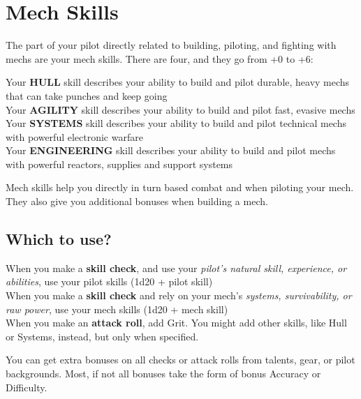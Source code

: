 \section{Mech Skills}

The part of your pilot directly related to building, piloting, and fighting with mechs are your mech
skills. There are four, and they go from +0 to +6:

Your \textbf{HULL} skill describes your ability to build and pilot durable, heavy mechs that can take
punches and keep going \\
Your \textbf{AGILITY} skill describes your ability to build and pilot fast,
evasive mechs \\
Your \textbf{SYSTEMS} skill describes your ability to build and pilot technical mechs with powerful
electronic warfare \\
Your \textbf{ENGINEERING} skill describes your ability to build and pilot mechs with powerful reactors,
supplies and support systems

Mech skills help you directly in turn based combat and when piloting your mech. They also give
you additional bonuses when building a mech.

\subsection*{Which to use?}

When you make a \textbf{skill check}, and use your \textit{pilot’s natural skill, experience, or abilities}, use your
pilot skills (1d20 + pilot skill) \\
When you make a \textbf{skill check} and rely on your mech’s \textit{systems, survivability, or raw power}, use
your mech skills (1d20 + mech skill) \\
When you make an \textbf{attack roll}, add Grit. You might add other skills, like Hull or Systems, instead,
but only when specified.

You can get extra bonuses on all checks or attack rolls from talents, gear, or pilot backgrounds.
Most, if not all bonuses take the form of bonus Accuracy or Difficulty.